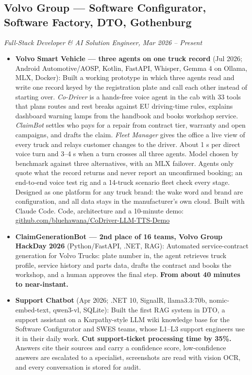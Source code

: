 \documentclass[a4paper,10pt]{article}
\begin{document}
\subsection*{Volvo Group --- Software Configurator, Software Factory, DTO, Gothenburg}
\textit{Full-Stack Developer \& AI Solution Engineer, Mar 2026 -- Present}
\begin{itemize}

  \item \textbf{Volvo Smart Vehicle --- three agents on one truck record} (Jul 2026; Android Automotive/AOSP, Kotlin, FastAPI, Whisper, Gemma 4 on Ollama, MLX, Docker): Built a working prototype in which three agents read and write one record keyed by the registration plate and call each other instead of starting over. \textit{Co-Driver} is a hands-free voice agent in the cab with 33 tools that plans routes and rest breaks against EU driving-time rules, explains dashboard warning lamps from the handbook and books workshop service. \textit{ClaimBot} settles who pays for a repair from contract tier, warranty and open campaigns, and drafts the claim. \textit{Fleet Manager} gives the office a live view of every truck and relays customer changes to the driver. About 1 s per direct voice turn and 3--4 s when a turn crosses all three agents. Model chosen by benchmark against three alternatives, with an MLX failover. Agents only quote what the record returns and never report an unconfirmed booking; an end-to-end voice test rig and a 14-truck scenario fleet check every stage. Designed as one platform for any truck brand: the wake word and brand are configuration, and all data stays in the manufacturer's own cloud. Built with Claude Code. Code, architecture and a 10-minute demo: \href{https://github.com/bluehawana/CoDriver-LLM-TTS-Demo}{github.com/bluehawana/CoDriver-LLM-TTS-Demo}

  \item \textbf{ClaimGenerationBot --- 2nd place of 16 teams, Volvo Group HackDay 2026} (Python/FastAPI, .NET, RAG): Automated service-contract generation for Volvo Trucks: plate number in, the agent retrieves truck profile, service history and parts data, drafts the contract and books the workshop, and a human approves the final step. \textbf{From about 40 minutes to near-instant.}

  \item \textbf{Support Chatbot} (Apr 2026; .NET 10, SignalR, llama3.3:70b, nomic-embed-text, qwen3-vl, SQLite): Built the first RAG system in DTO, a support assistant on a Karpathy-style LLM wiki knowledge base for the Software Configurator and SWES teams, whose L1--L3 support engineers use it in their daily work. \textbf{Cut support-ticket processing time by 35\%.} Answers cite their sources and carry a confidence score, low-confidence answers are escalated to a specialist, screenshots are read with vision OCR, and every conversation is stored for audit.


\end{itemize}
\end{document}
